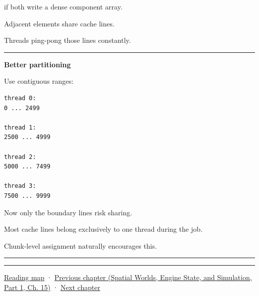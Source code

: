 if both write a dense component array.

Adjacent elements share cache lines.

Threads ping-pong those lines constantly.

\begin{center}\rule{0.5\linewidth}{0.5pt}\end{center}

\textbf{Better partitioning}

Use contiguous ranges:

\begin{verbatim}
thread 0:
0 ... 2499

thread 1:
2500 ... 4999

thread 2:
5000 ... 7499

thread 3:
7500 ... 9999
\end{verbatim}

Now only the boundary lines risk sharing.

Most cache lines belong exclusively to one thread during the job.

Chunk-level assignment naturally encourages this.

\begin{center}\rule{0.5\linewidth}{0.5pt}\end{center}

\begin{center}\rule{0.5\linewidth}{0.5pt}\end{center}

\hyperref[volume-reading-map]{Reading map} · \href{../05-Spatial-Worlds-Engine-State-and-Simulation-P01/main.pdf\#nameddest=05-engine-i-ch015-sparse-set-components-and-generational-entity-handles}{Previous chapter (Spatial Worlds, Engine State, and Simulation, Part 1, Ch. 15)} · \hyperref[05-engine-i-ch017-ecs-performance-through-cache-and-scheduling]{Next chapter}
